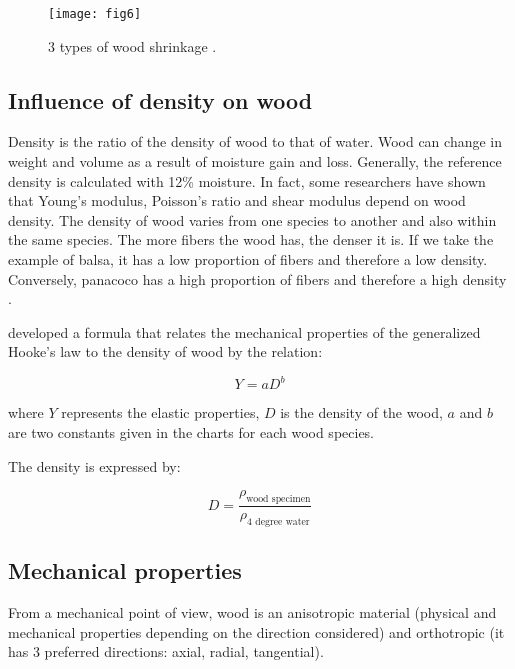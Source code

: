 \begin{figure}[htp]
	\centering
	\texttt{[image: fig6]}
	\caption{3 types of wood shrinkage \citep{Taazount2021}.}
	\label{fig:galaxy}
\end{figure}

\subsection{Influence of density on wood}

Density is the ratio of the density of wood to that of water. Wood can change in weight and volume as a result of moisture gain and loss. Generally, the reference density is calculated with 12\% moisture. In fact, some researchers have shown that Young's modulus, Poisson's ratio and shear modulus depend on wood density. The density of wood varies from one species to another and also within the same species. The more fibers the wood has, the denser it is. If we take the example of balsa, it has a low proportion of fibers and therefore a low density. Conversely, panacoco has a high proportion of fibers and therefore a high density \citep{Thibaut2015phd}.

\citep{BodigandJayne1982} developed a formula that relates the mechanical properties of the generalized Hooke's law to the density of wood by the relation:

\begin{equation}
	Y = a D^b
	\label{eq:eq12}
\end{equation}

\noindent where $Y$ represents the elastic properties, $D$ is the density of the wood, $a$ and $b$ are two constants given in the charts for each wood species.

The density is expressed by:

\begin{equation}
	D = \frac{\rho_\textrm{wood specimen}}{\rho_\textrm{4 degree water}}
	\label{eq:eq13}
\end{equation}

\subsection{Mechanical properties}

From a mechanical point of view, wood is an anisotropic material (physical and mechanical properties depending on the direction considered) and orthotropic (it has 3 preferred directions: axial, radial, tangential).

